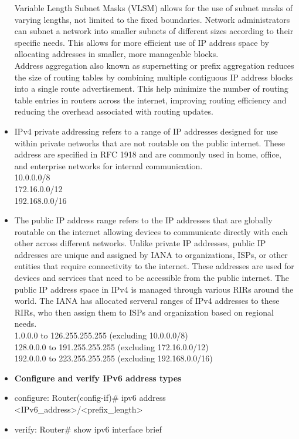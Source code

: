 \documentclass{article}
\begin{document}
\begin{itemize}
		Variable Length Subnet Masks (VLSM) allows for the use of subnet masks of varying lengths, not limited to the fixed boundaries. Network administrators can subnet a network into smaller subnets of different sizes according to their specific needs. This allows for more efficient use of IP address space by allocating addresses in smaller, more manageable blocks.\\
		Address aggregation also known as supernetting or prefix aggregation reduces the size of routing tables by combining multiple contiguous IP address blocks into a single route advertisement. This help minimize the number of routing table entries in routers across the internet, improving routing efficiency and reducing the overhead associated with routing updates.
	\item[] IPv4 private addressing refers to a range of IP addresses designed for use within private networks that are not routable on the public internet. These address are specified in RFC 1918 and are commonly used in home, office, and enterprise networks for internal communication.\\
		10.0.0.0/8\\
		172.16.0.0/12\\
		192.168.0.0/16
	\item[] The public IP address range refers to the IP addresses that are globally routable on the internet allowing devices to communicate directly with each other across different networks. Unlike private IP addresses, public IP addresses are unique and assigned by IANA to organizations, ISPs, or other entities that require connectivity to the internet. These addresses are used for devices and services that need to be accessible from the public internet. The public IP address space in IPv4 is managed through various RIRs around the world. The IANA has allocated serveral ranges of IPv4 addresses to these RIRs, who then assign them to ISPs and organization based on regional needs.\\
		1.0.0.0 to 126.255.255.255 (excluding 10.0.0.0/8)\\
		128.0.0.0 to 191.255.255.255 (excluding 172.16.0.0/12)\\
		192.0.0.0 to 223.255.255.255 (excluding 192.168.0.0/16)
  	
  
  \item \textbf{Configure and verify IPv6 address types}
  	\item[] configure: Router(config-if)\# ipv6 address \textless IPv6\_address\textgreater/\textless prefix\_length\textgreater
  	\item[] verify: Router\# show ipv6 interface brief
  

\end{itemize}
\end{document}

